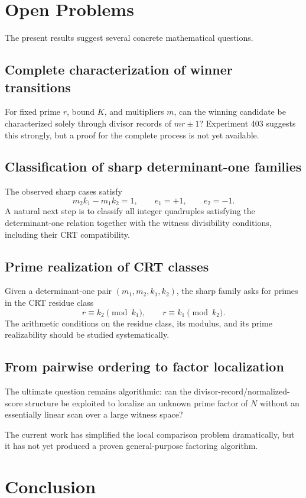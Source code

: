 \documentclass[11pt,a4paper]{article}
\begin{document}
\section{Open Problems}

The present results suggest several concrete mathematical questions.

\subsection{Complete characterization of winner transitions}
For fixed prime $r$, bound $K$, and multipliers $m$, can the winning candidate be characterized solely through divisor records of $mr\pm1$? Experiment 403 suggests this strongly, but a proof for the complete process is not yet available.

\subsection{Classification of sharp determinant-one families}
The observed sharp cases satisfy
\[
    m_2k_1-m_1k_2=1,
    \qquad
    e_1=+1,
    \qquad
    e_2=-1.
\]
A natural next step is to classify all integer quadruples satisfying the determinant-one relation together with the witness divisibility conditions, including their CRT compatibility.

\subsection{Prime realization of CRT classes}
Given a determinant-one pair $(m_1,m_2,k_1,k_2)$, the sharp family asks for primes in the CRT residue class
\[
    r\equiv k_2\pmod{k_1},
    \qquad
    r\equiv k_1\pmod{k_2}.
\]
The arithmetic conditions on the residue class, its modulus, and its prime realizability should be studied systematically.

\subsection{From pairwise ordering to factor localization}
The ultimate question remains algorithmic: can the divisor-record/normalized-score structure be exploited to localize an unknown prime factor of $N$ without an essentially linear scan over a large witness space?

The current work has simplified the local comparison problem dramatically, but it has not yet produced a proven general-purpose factoring algorithm.

\section{Conclusion}
\end{document}
